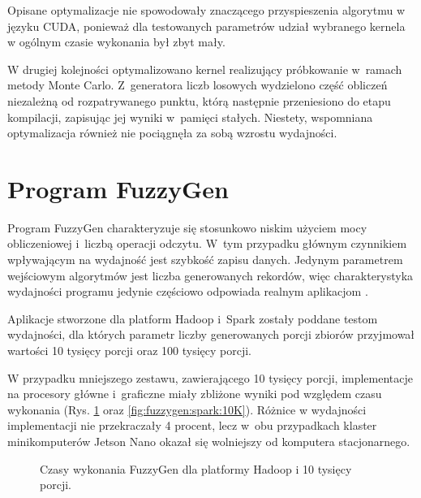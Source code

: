 Opisane optymalizacje nie spowodowały znaczącego przyspieszenia algorytmu w języku CUDA, ponieważ
dla testowanych parametrów udział wybranego kernela w ogólnym czasie wykonania był zbyt mały.

W drugiej kolejności optymalizowano kernel realizujący próbkowanie w~ramach metody Monte Carlo.
Z~generatora liczb losowych wydzielono część obliczeń niezależną od rozpatrywanego punktu,
którą następnie przeniesiono do etapu kompilacji, zapisując jej wyniki w~pamięci stałych.
Niestety, wspomniana optymalizacja również nie pociągnęła za sobą wzrostu wydajności.

\section{Program FuzzyGen}

Program FuzzyGen charakteryzuje się stosunkowo niskim użyciem mocy obliczeniowej i~liczbą operacji odczytu.
W~tym przypadku głównym czynnikiem wpływającym na wydajność jest szybkość zapisu danych. Jedynym
parametrem wejściowym algorytmów jest liczba generowanych rekordów, więc charakterystyka wydajności
programu jedynie częściowo odpowiada realnym aplikacjom .

Aplikacje stworzone dla platform Hadoop i~Spark zostały poddane testom wydajności, dla których parametr
liczby generowanych porcji zbiorów przyjmował wartości 10 tysięcy porcji oraz 100 tysięcy porcji.

W przypadku mniejszego zestawu, zawierającego 10 tysięcy porcji, implementacje na procesory główne
i~graficzne miały zbliżone wyniki pod względem czasu wykonania (Rys. \ref{fig:fuzzygen:hadoop:10K}
oraz \ref{fig:fuzzygen:spark:10K}). Różnice w wydajności implementacji nie przekraczały 4 procent,
lecz w~obu przypadkach klaster minikomputerów Jetson Nano okazał się wolniejszy od komputera
stacjonarnego.

\begin{figure}[h!]
    \centering
    \caption{Czasy wykonania FuzzyGen dla platformy Hadoop i 10 tysięcy porcji.}
    \label{fig:fuzzygen:hadoop:10K}
\end{figure}

